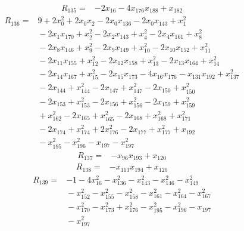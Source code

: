 {\begin{align*}
\end{align*}
\begin{align*}
R_{135} ={}& -2x_{16} - 4x_{176} x_{188} + x_{182}
\end{align*}
\begin{align*}
R_{136} ={}& 9 + 2x_{0}^{2} + 2x_{0} x_{2} - 2x_{0} x_{136} - 2x_{0} x_{143} + x_{1}^{2} \\
&{}  - 2x_{1} x_{170} + x_{2}^{2} - 2x_{2} x_{143} + x_{4}^{2} - 2x_{4} x_{161} + x_{8}^{2} \\
&{}  - 2x_{8} x_{146} + x_{9}^{2} - 2x_{9} x_{149} + x_{10}^{2} - 2x_{10} x_{152} + x_{11}^{2} \\
&{}  - 2x_{11} x_{155} + x_{12}^{2} - 2x_{12} x_{158} + x_{13}^{2} - 2x_{13} x_{164} + x_{14}^{2} \\
&{}  - 2x_{14} x_{167} + x_{15}^{2} - 2x_{15} x_{173} - 4x_{16} x_{176} - x_{131} x_{192} + x_{137}^{2} \\
&{}  - 2x_{144} + x_{144}^{2} - 2x_{147} + x_{147}^{2} - 2x_{150} + x_{150}^{2} \\
&{}  - 2x_{153} + x_{153}^{2} - 2x_{156} + x_{156}^{2} - 2x_{159} + x_{159}^{2} \\
&{}  + x_{162}^{2} - 2x_{165} + x_{165}^{2} - 2x_{168} + x_{168}^{2} + x_{171}^{2} \\
&{}  - 2x_{174} + x_{174}^{2} + 2x_{176}^{2} - 2x_{177} + x_{177}^{2} + x_{192} \\
&{}  - x_{195}^{2} - x_{196}^{2} - x_{197} - x_{197}^{2}
\end{align*}
\begin{align*}
R_{137} ={}& -x_{96} x_{193} + x_{120}
\end{align*}
\begin{align*}
R_{138} ={}& -x_{113} x_{194} + x_{120}
\end{align*}
\begin{align*}
R_{139} ={}& -1 - 4x_{16}^{2} - x_{136}^{2} - x_{143}^{2} - x_{146}^{2} - x_{149}^{2} \\
&{}  - x_{152}^{2} - x_{155}^{2} - x_{158}^{2} - x_{161}^{2} - x_{164}^{2} - x_{167}^{2} \\
&{}  - x_{170}^{2} - x_{173}^{2} + x_{176}^{2} - x_{195}^{2} - x_{196}^{2} - x_{197} \\
&{}  - x_{197}^{2}
\end{align*}
}
